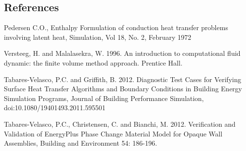 \subsection{References}\label{references-013}

Pedersen C.O., Enthalpy Formulation of conduction heat transfer problems involving latent heat, Simulation, Vol 18, No. 2, February 1972

Versteeg, H. and Malalasekra, W. 1996. An introduction to computational fluid dynamic: the finite volume method approach. Prentice Hall.

Tabares-Velasco, P.C. and Griffith, B. 2012. Diagnostic Test Cases for Verifying Surface Heat Transfer Algorithms and Boundary Conditions in Building Energy Simulation Programs, Journal of Building Performance Simulation, doi:10.1080/19401493.2011.595501

Tabares-Velasco, P.C., Christensen, C. and Bianchi, M. 2012. Verification and Validation of EnergyPlus Phase Change Material Model for Opaque Wall Assemblies, Building and Environment 54: 186-196.
